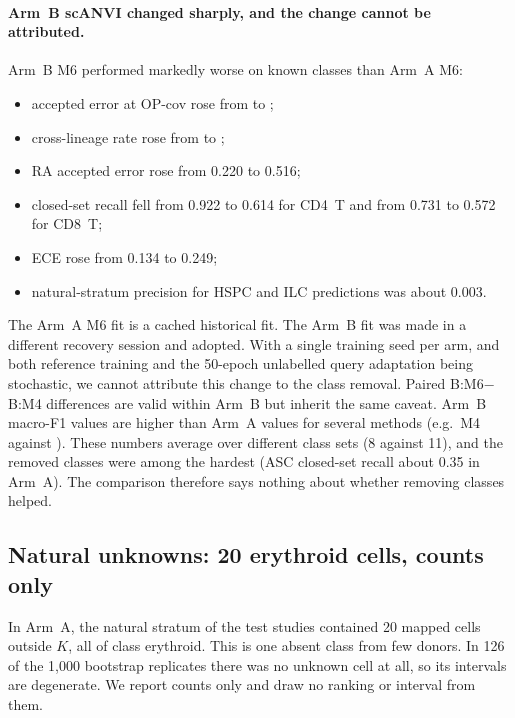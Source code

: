 \documentclass[11pt]{article}
\begin{document}
\paragraph{Arm~B scANVI changed sharply, and the change cannot be attributed.} Arm~B M6 performed markedly worse on known classes than Arm~A M6:
\begin{itemize}
\item accepted error at OP-cov rose from  to ;
\item cross-lineage rate rose from  to ;
\item RA accepted error rose from 0.220 to 0.516;
\item closed-set recall fell from 0.922 to 0.614 for CD4~T and from 0.731 to 0.572 for CD8~T;
\item ECE rose from 0.134 to 0.249;
\item natural-stratum precision for HSPC and ILC predictions was about 0.003.
\end{itemize}
The Arm~A M6 fit is a cached historical fit. The Arm~B fit was made in a different recovery session and adopted. With a single training seed per arm, and both reference training and the 50-epoch unlabelled query adaptation being stochastic, we cannot attribute this change to the class removal. Paired B:M6$-$B:M4 differences are valid within Arm~B but inherit the same caveat. Arm~B macro-F1 values are higher than Arm~A values for several methods (e.g.\ M4  against ). These numbers average over different class sets (8 against 11), and the removed classes were among the hardest (ASC closed-set recall about 0.35 in Arm~A). The comparison therefore says nothing about whether removing classes helped.

\subsection{Natural unknowns: 20 erythroid cells, counts only}\label{sec:natunk}

In Arm~A, the natural stratum of the test studies contained 20 mapped cells outside $K$, all of class erythroid. This is one absent class from few donors. In 126 of the 1{,}000 bootstrap replicates there was no unknown cell at all, so its intervals are degenerate. We report counts only and draw no ranking or interval from them.
\end{document}
